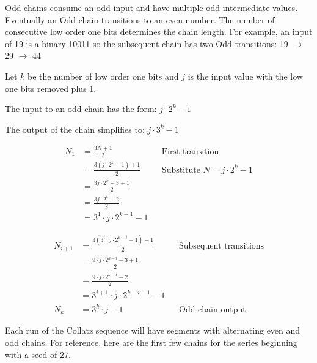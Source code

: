 \documentclass[preprint,natbib]{sigplanconf}
\begin{document}
Odd chains consume an odd input and have multiple odd intermediate values. Eventually an Odd chain transitions to an even number. The number of consecutive low order one bits determines the chain length. For example, an input of 19 is a binary 10011 so the subsequent chain has two Odd transitions: 19 $\to$ 29 $\to$ 44

Let \( k \) be the number of low order one bits and \( j \) is the input value with the low one bits removed plus 1.

The input to an odd chain has the form: \( j \cdot 2^k - 1 \)

The output of the chain simplifies to: \( j \cdot 3^k - 1 \)

\begin{align*}
    N_1 & = \frac{3N + 1}{2}                 &  & \text{First transition}                \\
        & = \frac{3(j \cdot 2^k - 1) + 1}{2} &  & \text{Substitute } N = j \cdot 2^k - 1 \\
        & = \frac{3j \cdot 2^k - 3 + 1}{2}                                               \\
        & = \frac{3j \cdot 2^k - 2}{2}                                                   \\
        & = 3^1 \cdot j \cdot 2^{k-1} - 1
\end{align*}

\begin{align*}
    N_{i+1} & = \frac{3 \left(3^i \cdot j \cdot 2^{k-i} - 1\right) + 1}{2} &  & \text{Subsequent transitions} \\
            & = \frac{9 \cdot j \cdot 2^{k-i} - 3 + 1}{2}                                                     \\
            & = \frac{9 \cdot j \cdot 2^{k-i} - 2}{2}                                                         \\
            & = 3^{i+1} \cdot j \cdot 2^{k-i-1} - 1                                                           \\
    N_k     & = 3^k \cdot j - 1                                            &  & \text{Odd chain output}
\end{align*}

Each run of the Collatz sequence will have segments with alternating even and odd chains. For reference, here are the first few chains for the series beginning with a seed of 27.
\end{document}
